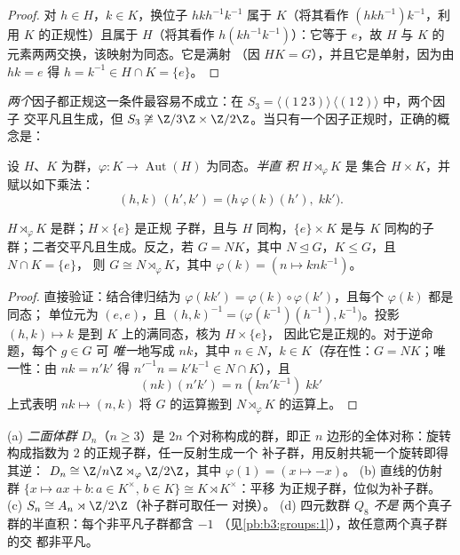 \begin{proof}
对 $h \in H$，$k \in K$，换位子 $hkh^{-1}k^{-1}$ 属于
$K$（将其看作 $(hkh^{-1})k^{-1}$，利用 $K$ 的正规性）且属于
$H$（将其看作 $h(kh^{-1}k^{-1})$）：它等于 $e$，故 $H$ 与 $K$
的元素两两交换，该映射为同态。它是满射
（因 $HK = G$），并且它是单射，因为由 $hk = e$ 得 $h = k^{-1} \in
H \cap K = \{e\}$。
\end{proof}

\emph{两个}因子都正规这一条件最容易不成立：在 $S_3
= \langle (1\,2\,3)\rangle \,\langle(1\,2)\rangle$ 中，两个因子
交平凡且生成，但 $S_3 \not\cong \Z/3\Z \times
\Z/2\Z$。当只有一个因子正规时，正确的概念是：

\begin{definition}\label{def:b3:groups:semidirect}
设 $H$、$K$ 为群，$\varphi \colon K \to
\operatorname{Aut}(H)$ 为同态。\emph{半直
积} $H \rtimes_\varphi K$ 是
集合 $H \times K$，并赋以如下乘法：
\[
(h, k)\,(h', k') = \bigl(h\,\varphi(k)(h'),\; kk'\bigr).
\]
\end{definition}

\begin{proposition}\label{prop:b3:groups:semidirect}
$H \rtimes_\varphi K$ 是群；$H \times \{e\}$ 是正规
子群，且与 $H$ 同构，$\{e\} \times K$ 是与
$K$ 同构的子群；二者交平凡且生成。反之，若 $G =
NK$，其中 $N \trianglelefteq G$，$K \leq G$，且 $N \cap K = \{e\}$，
则 $G \cong N \rtimes_\varphi K$，其中 $\varphi(k) = (n \mapsto
knk^{-1})$。
\end{proposition}

\begin{proof}
直接验证：结合律归结为 $\varphi(kk') =
\varphi(k)\circ\varphi(k')$，且每个 $\varphi(k)$ 都是同态；
单位元为 $(e,e)$，且 $(h,k)^{-1} =
\bigl(\varphi(k^{-1})(h^{-1}), k^{-1}\bigr)$。投影 $(h,k)
\mapsto k$ 是到 $K$ 上的满同态，核为 $H \times \{e\}$，
因此它是正规的。对于逆命题，每个 $g \in G$ 可
\emph{唯一}地写成 $nk$，其中 $n \in N$，$k \in K$（存在性：$G =
NK$；唯一性：由 $nk = n'k'$ 得 $n'^{-1}n = k'k^{-1} \in N \cap
K$），且
\[
(nk)(n'k') = n\,(kn'k^{-1})\;kk'
\]
上式表明 $nk \mapsto (n, k)$ 将 $G$ 的运算搬到
$N \rtimes_\varphi K$ 的运算上。
\end{proof}

\begin{example}\label{ex:b3:groups:semidirectexamples}
(a) \emph{二面体群} $D_n$（$n \geq
3$）是 $2n$ 个对称构成的群，即正 $n$ 边形的全体对称：旋转
构成指数为 $2$ 的正规子群，任一反射生成一个
补子群，用反射共轭一个旋转即得其逆：
$D_n \cong \Z/n\Z \rtimes_\varphi \Z/2\Z$，其中 $\varphi(1) = (x
\mapsto -x)$。
(b) 直线的仿射群 $\{x \mapsto ax + b : a \in
K^\times,\, b \in K\} \cong K \rtimes K^\times$：平移
为正规子群，位似为补子群。
(c) $S_n \cong A_n \rtimes \Z/2\Z$（补子群可取任一
对换）。
(d) 四元数群 $Q_8$ \emph{不是}
两个真子群的半直积：每个非平凡子群都含 $-1$
（见\cref{pb:b3:groups:1}），故任意两个真子群的交
都非平凡。
\end{example}

